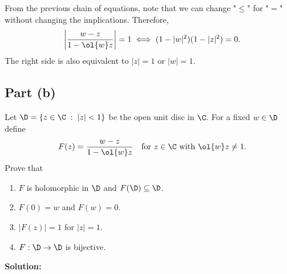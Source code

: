 From the previous chain of equations, note that we can change "$\leq$" for "$=$" without changing the implications. Therefore, 
    \[ \left| \frac{w-z}{1-\ol{w}z} \right| = 1 \iff (1 - |w|^2)(1 - |z|^2) = 0.\]
The right side is also equivalent to $|z| = 1$ or $|w| = 1$.

\subsection*{Part (b)}
Let $\D = \{ z \in \C \;:\; |z| < 1\}$ be the open unit disc in $\C$. For a fixed $w\in \D$ define
\[ F(z) = \frac{w-z}{1-\ol{w}z}\hspace*{1em} \mbox{for $z \in \C$ with $\ol{w}z \neq 1$.} \]
Prove that
\begin{enumerate}[label=(\roman*)]
    \item $F$ is holomorphic in $\D$ and $F(\D) \subseteq \D$.
    \item $F(0) = w$ and $F(w) = 0$.
    \item $|F(z)| = 1$ for $|z| = 1$.
    \item $F: \D \to \D$ is bijective.
\end{enumerate}

\textbf{Solution:}

